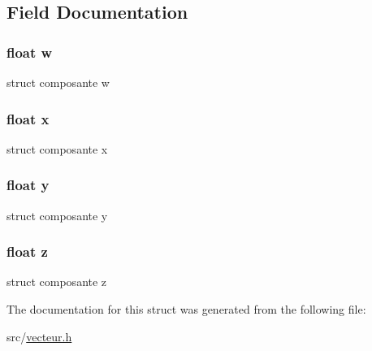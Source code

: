 \subsection{Field Documentation}
\hypertarget{structvecteur4_a56eca241e2896b9f57a79589e76fd24b}{
\subsubsection[{w}]{\setlength{\rightskip}{0pt plus 5cm}float {\bf w}}}
\label{structvecteur4_a56eca241e2896b9f57a79589e76fd24b}
struct composante w \hypertarget{structvecteur4_ad0da36b2558901e21e7a30f6c227a45e}{
\subsubsection[{x}]{\setlength{\rightskip}{0pt plus 5cm}float {\bf x}}}
\label{structvecteur4_ad0da36b2558901e21e7a30f6c227a45e}
struct composante x \hypertarget{structvecteur4_aa4f0d3eebc3c443f9be81bf48561a217}{
\subsubsection[{y}]{\setlength{\rightskip}{0pt plus 5cm}float {\bf y}}}
\label{structvecteur4_aa4f0d3eebc3c443f9be81bf48561a217}
struct composante y \hypertarget{structvecteur4_af73583b1e980b0aa03f9884812e9fd4d}{
\subsubsection[{z}]{\setlength{\rightskip}{0pt plus 5cm}float {\bf z}}}
\label{structvecteur4_af73583b1e980b0aa03f9884812e9fd4d}
struct composante z 

The documentation for this struct was generated from the following file:\begin{DoxyCompactItemize}
\item 
src/\hyperlink{vecteur_8h}{vecteur.h}\end{DoxyCompactItemize}
